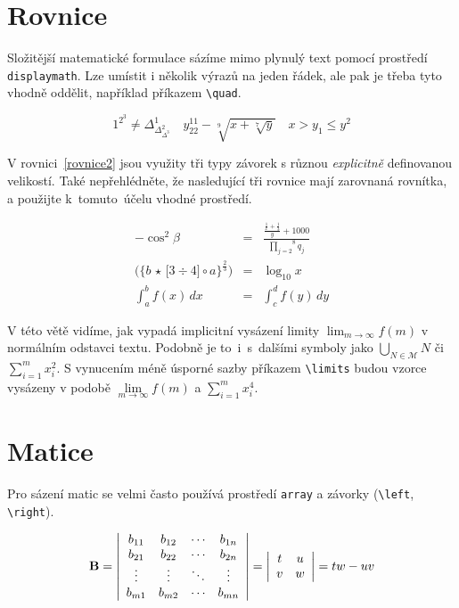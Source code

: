 \documentclass[11pt, a4paper, twocolumn]{article}
\theoremstyle{definition}
\begin{document}
\section{Rovnice}
Složitější matematické formulace sázíme mimo plynulý text pomocí prostředí \verb|displaymath|. Lze umístit i ně\-ko\-lik výrazů na jeden řádek, ale pak je třeba tyto vhodně oddělit, například příkazem \verb|\quad|.

\begin{displaymath}
    1^{2^3} \neq \Delta^1_{\Delta^2_{\Delta^3}} \quad y^{11}_{22} - \sqrt[9]{x + \sqrt[7]{y}} \quad x > y_1 \leq y^2
\end{displaymath}

\noindent V rovnici~\eqref{rovnice2} jsou využity tři typy závorek s různou \emph{ex\-pli\-cit\-ně} definovanou velikostí. Také nepřehlédněte, že nasledující tři rovnice mají zarovnaná rovnítka, a použijte k~tomuto~účelu vhodné prostředí.


\begin{eqnarray}
    -\cos^2{\beta} & = & \frac{\frac{\frac{1}{x} + \frac{1}{3}}{y} + {1000}}{\overset{8}{\underset{j = 2}{\prod}}q_j} \\
    \label{rovnice2}
    \bigg(\Big\{b\, \star\, \bigr[3 \div 4\bigr] \circ a\Big\}^{\frac{2}{3}}\bigg) & = & \log_{10}x \\
    \label{rovnice3}
    \int^b_a f(x)\,dx & = & \int^d_c f(y)\,dy
\end{eqnarray}

\noindent V této větě vidíme, jak vypadá implicitní vysázení limity $\lim_{m \to \infty} f(m)$ v normálním odstavci textu. Podobně je to~i~s~dalšími symboly jako $\bigcup_{N \in \mathcal{M}}N$ či $\sum_{i=1}^m x_i^2$. S vy\-nu\-ce\-ním méně úsporné sazby příkazem \verb|\limits| budou vzorce vysázeny v podobě $\lim\limits_{m \to \infty}f(m)$ a $\sum\limits^m_{i=1}x^4_i$.

\section{Matice}
Pro sázení matic se velmi často používá prostředí \verb|array| a závorky (\verb|\left|, \verb|\right|).


$$ \text{\textbf{B}} = \left|
\begin{array}{cccc}
b_{11} & b_{12} & \cdots & b_{1n} \\
b_{21} & b_{22} & \cdots & b_{2n} \\
\vdots & \vdots & \ddots & \vdots \\
b_{m1} & b_{m2} & \cdots & b_{mn}
\end{array} \right|
= \left|
\begin{array}{cc}
t & u\\
v & w
\end{array}\right|
= tw - uv$$
\end{document}
